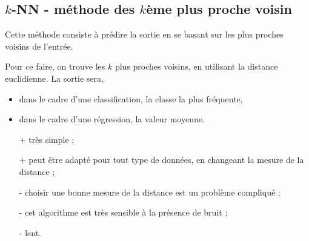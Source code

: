 \subsection{$k$-NN - méthode des $k$ème plus proche voisin}
		
Cette méthode consiste à prédire la sortie en se basant sur les plus proches voisins de l'entrée.
		
		
Pour ce faire, on trouve les $k$ plus proches voisins, en utilisant la distance euclidienne. La sortie sera,
		
\begin{itemize}
	\item dans le cadre d'une classification, la classe la plus fréquente,
	\item dans le cadre d'une régression, la valeur moyenne.
\end{itemize}
		
		
\begin{itemize}
	\item[+] très simple ;
	\item[+] peut être adapté pour tout type de données, en changeant la mesure de la distance ;
	\item[-] choisir une bonne mesure de la distance est un problème compliqué ;
	\item[-] cet algorithme est très sensible à la présence de bruit ;
	\item[-] lent.
\end{itemize}
